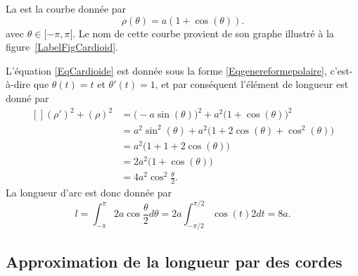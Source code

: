 \begin{example}
	La  est la courbe donnée par
	\begin{equation}        \label{EqCardioide}
		\rho(\theta)=a(1+\cos(\theta)).
	\end{equation}
	avec $\theta\in\mathopen[ -\pi , \pi \mathclose]$. Le nom de cette courbe provient de son graphe illustré à la figure~\ref{LabelFigCardioid}.
	\newcommand{\CaptionFigCardioid}{Une cardioïde, $\rho=1+\cos(\theta)$.}
	

	L'équation \eqref{EqCardioide} est donnée sous la forme \eqref{Eqgenereformepolaire}, c'est-à-dire que $\theta(t)=t$ et $\theta'(t)=1$, et par conséquent l'élément de longueur est donné par
	\begin{equation}
		\begin{aligned}[]
			(\rho')^2+(\rho)^2 & =\big( -a\sin(\theta) \big)^2+a^2\big( 1+\cos(\theta) \big)^2    \\
			                   & =a^2\sin^2(\theta)+a^2\big( 1+2\cos(\theta)+\cos^2(\theta) \big) \\
			                   & =a^2\big( 1+1+2\cos(\theta) \big)                                \\
			                   & =2a^2\big( 1+\cos(\theta) \big)                                  \\
			                   & =4a^2\cos^2\frac{ \theta }{2}.
		\end{aligned}
	\end{equation}
	La longueur d'arc est donc donnée par
	\begin{equation}
		l=\int_{-\pi}^{\pi}2a\cos\frac{ \theta }{2}d\theta=2a\int_{-\pi/2}^{\pi/2}\cos(t)2dt=8a.
	\end{equation}
\end{example}

\subsection{Approximation de la longueur par des cordes}

